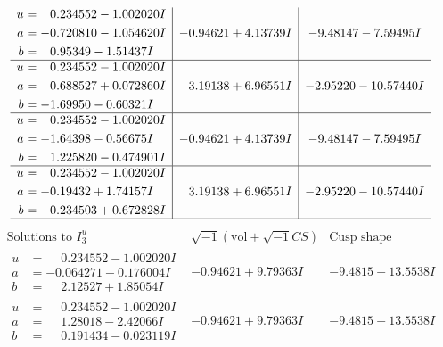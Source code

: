 \documentclass[1p]{elsarticle_modified}
\theoremstyle{definition}
\newcommand{\I}{\sqrt{-1}}
\begin{document}
$$\begin{array}{c|c|c}
\begin{aligned}
u &= \phantom{-}0.234552 - 1.002020 I \\
a &= -0.720810 - 1.054620 I \\
b &= \phantom{-}0.95349 - 1.51437 I\end{aligned}
 & -0.94621 + 4.13739 I & -9.48147 - 7.59495 I \\ \hline\begin{aligned}
u &= \phantom{-}0.234552 - 1.002020 I \\
a &= \phantom{-}0.688527 + 0.072860 I \\
b &= -1.69950 - 0.60321 I\end{aligned}
 & \phantom{-}3.19138 + 6.96551 I & -2.95220 - 10.57440 I \\ \hline\begin{aligned}
u &= \phantom{-}0.234552 - 1.002020 I \\
a &= -1.64398 - 0.56675 I \\
b &= \phantom{-}1.225820 - 0.474901 I\end{aligned}
 & -0.94621 + 4.13739 I & -9.48147 - 7.59495 I \\ \hline\begin{aligned}
u &= \phantom{-}0.234552 - 1.002020 I \\
a &= -0.19432 + 1.74157 I \\
b &= -0.234503 + 0.672828 I\end{aligned}
 & \phantom{-}3.19138 + 6.96551 I & -2.95220 - 10.57440 I\\
 \hline 
 \end{array}$$\newpage$$\begin{array}{c|c|c}  
\text{Solutions to }I^u_{3}& \I (\text{vol} + \sqrt{-1}CS) & \text{Cusp shape}\\
 \hline 
\begin{aligned}
u &= \phantom{-}0.234552 - 1.002020 I \\
a &= -0.064271 - 0.176004 I \\
b &= \phantom{-}2.12527 + 1.85054 I\end{aligned}
 & -0.94621 + 9.79363 I & -9.4815 - 13.5538 I \\ \hline\begin{aligned}
u &= \phantom{-}0.234552 - 1.002020 I \\
a &= \phantom{-}1.28018 - 2.42066 I \\
b &= \phantom{-}0.191434 - 0.023119 I\end{aligned}
 & -0.94621 + 9.79363 I & -9.4815 - 13.5538 I \\ \hline\begin{aligned}

\end{aligned}
\end{array}$$
\end{document}
